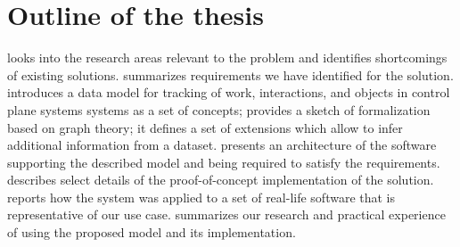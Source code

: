 \section{Outline of the thesis}

 looks into the research areas relevant to the problem and identifies shortcomings of existing solutions.  
 summarizes requirements we have identified for the solution.  
 introduces a data model for tracking of work, interactions, and objects in control plane systems systems as a set of concepts; provides a sketch of formalization based on graph theory; it defines a set of extensions which allow to infer additional information from a dataset.  
 presents an architecture of the software supporting the described model and being required to satisfy the requirements.  
 describes select details of the proof-of-concept implementation of the solution.  
 reports how the system was applied to a set of real-life software that is representative of our use case.  
 summarizes our research and practical experience of using the proposed model and its implementation.